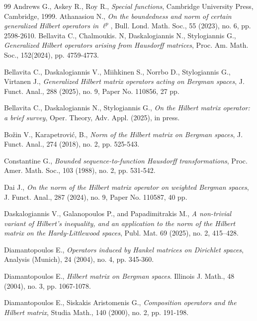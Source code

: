 \documentclass[10pt]{amsart}
\theoremstyle{definition}
\theoremstyle{question}
\numberwithin{equation}{section}
\begin{document}
\begin{thebibliography}{99}
Andrews G., Askey R.,  Roy R.,  {\em Special functions},  Cambridge University Press, Cambridge, 1999.
Athanasiou N., {\em On the boundedness and norm of certain generalized Hilbert operators in $\ell^p$}, Bull. Lond. Math. Soc., 55 (2023), no. 6, pp. 2598-2610.
Bellavita C., Chalmoukis. N, Daskalogiannis N., Stylogiannis G., {\em Generalized Hilbert operators arising from Hausdorff matrices}, Proc. Am. Math. Soc., 152(2024), pp. 4759-4773.  

Bellavita C., Daskalogiannis V., Miihkinen S., Norrbo D., Stylogiannis G., Virtanen J., {\em Generalized Hilbert matrix operators acting on Bergman spaces}, J. Funct. Anal., 288 (2025), no. 9, Paper No. 110856, 27 pp.

Bellavita C., Daskalogiannis N., Stylogiannis G., {\em On the Hilbert matrix operator: a brief survey}, Oper. Theory, Adv. Appl. (2025), in press. 

 Bo\v{z}in V., Karapetrovi\'{c}, B., {\em  Norm of the Hilbert matrix on Bergman spaces},  J. Funct. Anal., 274 (2018), no. 2, pp. 525-543.

Constantine G., {\em Bounded sequence-to-function Hausdorff transformations}, Proc. Amer. Math. Soc., 103 (1988), no. 2, pp. 531-542.

Dai J., {\em On the norm of the Hilbert matrix operator on weighted Bergman spaces}, J. Funct. Anal.,  287 (2024), no. 9, Paper No. 110587, 40 pp.

Daskalogiannis V., Galanopoulos P., and Papadimitrakis M., {\em A non-trivial variant of Hilbert’s
inequality, and an application to the norm of the Hilbert matrix on the Hardy-Littlewood spaces},
Publ. Mat. 69 (2025), no. 2, 415–428.

 Diamantopoulos E., {\em Operators induced by Hankel matrices on Dirichlet spaces}, Analysis (Munich), 24 (2004), no. 4, pp. 345-360.

Diamantopoulos E., {\em Hilbert matrix on Bergman spaces}. Illinois J. Math., 48 (2004), no. 3, pp. 1067-1078.

Diamantopoulos E., Siskakis  Aristomenis G., {\em Composition operators and the Hilbert matrix}, Studia Math., 140 (2000), no. 2, pp. 191-198.


\end{thebibliography}
\end{document}
